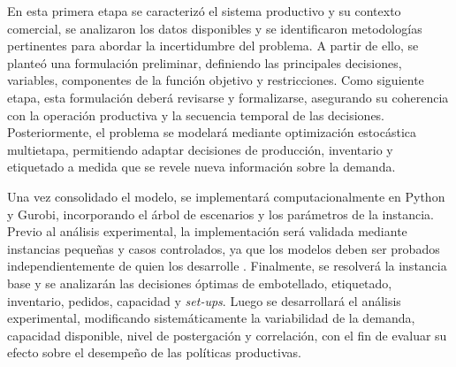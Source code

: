 En esta primera etapa se caracterizó el sistema productivo y su contexto comercial, se analizaron los datos disponibles y se identificaron metodologías pertinentes para abordar la incertidumbre del problema. A partir de ello, se planteó una formulación preliminar, definiendo las principales decisiones, variables, componentes de la función objetivo y restricciones. Como siguiente etapa, esta formulación deberá revisarse y formalizarse, asegurando su coherencia con la operación productiva y la secuencia temporal de las decisiones. Posteriormente, el problema se modelará mediante optimización estocástica multietapa, permitiendo adaptar decisiones de producción, inventario y etiquetado a medida que se revele nueva información sobre la demanda.

Una vez consolidado el modelo, se implementará computacionalmente en Python y Gurobi, incorporando el árbol de escenarios y los parámetros de la instancia. Previo al análisis experimental, la implementación será validada mediante instancias pequeñas y casos controlados, ya que los modelos deben ser probados independientemente de quien los desarrolle \cite[p.~29]{perez2019modelos}. Finalmente, se resolverá la instancia base y se analizarán las decisiones óptimas de embotellado, etiquetado, inventario, pedidos, capacidad y \textit{set-ups}. Luego se desarrollará el análisis experimental, modificando sistemáticamente la variabilidad de la demanda, capacidad disponible, nivel de postergación y correlación, con el fin de evaluar su efecto sobre el desempeño de las políticas productivas.

